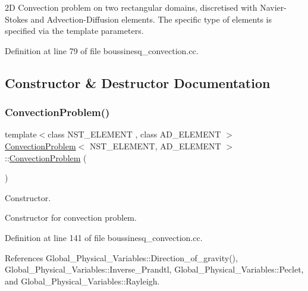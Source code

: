 2D Convection problem on two rectangular domains, discretised with Navier-\/\+Stokes and Advection-\/\+Diffusion elements. The specific type of elements is specified via the template parameters. 

Definition at line 79 of file boussinesq\+\_\+convection.\+cc.



\subsection{Constructor \& Destructor Documentation}
\mbox{\label{classConvectionProblem_a0c68c4c4b67d9fc8c9900fc895eed973}} 
\subsubsection{\texorpdfstring{Convection\+Problem()}{ConvectionProblem()}\hspace{0.1cm}{\footnotesize\ttfamily [1/2]}}
{\footnotesize\ttfamily template$<$class N\+S\+T\+\_\+\+E\+L\+E\+M\+E\+NT , class A\+D\+\_\+\+E\+L\+E\+M\+E\+NT $>$ \\
\hyperlink{classConvectionProblem}{Convection\+Problem}$<$ N\+S\+T\+\_\+\+E\+L\+E\+M\+E\+NT, A\+D\+\_\+\+E\+L\+E\+M\+E\+NT $>$\+::\hyperlink{classConvectionProblem}{Convection\+Problem} (\begin{DoxyParamCaption}{ }\end{DoxyParamCaption})}



Constructor. 

Constructor for convection problem. 

Definition at line 141 of file boussinesq\+\_\+convection.\+cc.



References Global\+\_\+\+Physical\+\_\+\+Variables\+::\+Direction\+\_\+of\+\_\+gravity(), Global\+\_\+\+Physical\+\_\+\+Variables\+::\+Inverse\+\_\+\+Prandtl, Global\+\_\+\+Physical\+\_\+\+Variables\+::\+Peclet, and Global\+\_\+\+Physical\+\_\+\+Variables\+::\+Rayleigh.

\mbox{\label{classConvectionProblem_a77c37355ba683b5b1ec11d096ce4d760}} 

